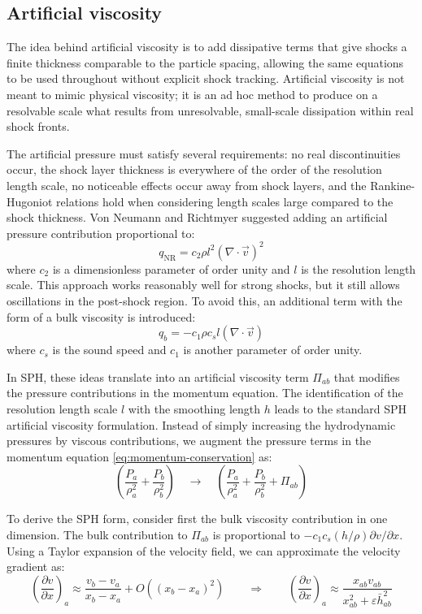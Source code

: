 \subsection{Artificial viscosity}

The idea behind artificial viscosity is to add dissipative terms that give shocks a finite thickness comparable to the particle spacing, allowing the same equations to be used throughout without explicit shock tracking. Artificial viscosity is not meant to mimic physical viscosity; it is an ad hoc method to produce on a resolvable scale what results from unresolvable, small-scale dissipation within real shock fronts.

The artificial pressure must satisfy several requirements: no real discontinuities occur, the shock layer thickness is everywhere of the order of the resolution length scale, no noticeable effects occur away from shock layers, and the Rankine-Hugoniot relations hold when considering length scales large compared to the shock thickness. Von Neumann and Richtmyer suggested adding an artificial pressure contribution proportional to:
$$q_{\text{NR}} = c_2 \rho l^2 (\nabla \cdot \vec{v})^2$$
where $c_2$ is a dimensionless parameter of order unity and $l$ is the resolution length scale. This approach works reasonably well for strong shocks, but it still allows oscillations in the post-shock region. To avoid this, an additional term with the form of a bulk viscosity is introduced: 
$$q_b = -c_1 \rho c_s l (\nabla \cdot \vec{v})$$
where $c_s$ is the sound speed and $c_1$ is another parameter of order unity.

In SPH, these ideas translate into an artificial viscosity term $\Pi_{ab}$ that modifies the pressure contributions in the momentum equation. The identification of the resolution length scale $l$ with the smoothing length $h$ leads to the standard SPH artificial viscosity formulation. Instead of simply increasing the hydrodynamic pressures by viscous contributions, we augment the pressure terms in the momentum equation \eqref{eq:momentum-conservation} as:
$$
\left(\dfrac{P_a}{\rho_a^2} + \dfrac{P_b}{\rho_b^2}\right) 
\quad \longrightarrow \quad
\left(\dfrac{P_a}{\rho_a^2} + \dfrac{P_b}{\rho_b^2} + \Pi_{ab}\right)
$$

To derive the SPH form, consider first the bulk viscosity contribution in one dimension. The bulk contribution to $\Pi_{ab}$ is proportional to $-c_1 c_s (h/\rho) \partial v / \partial x$. Using a Taylor expansion of the velocity field, we can approximate the velocity gradient as:
$$
\left(\frac{\partial v}{\partial x}\right)_a \approx \frac{v_b - v_a}{x_b - x_a} + O((x_b - x_a)^2) \qquad \Rightarrow \qquad \left(\frac{\partial v}{\partial x}\right)_a \approx \frac{x_{ab} v_{ab}}{x_{ab}^2 + \varepsilon \bar{h}_{ab}^2}
$$

